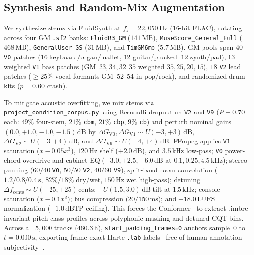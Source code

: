 \documentclass{article}
\begin{document}
\subsection{Synthesis and Random-Mix Augmentation}\label{subsec:random_mix}

We synthesize stems via FluidSynth at $f_s = 22{,}050\,\text{Hz}$ ($16$-bit FLAC), rotating across four GM {\small\texttt{.sf2}} banks: {\small\texttt{FluidR3\_GM}} ($141\,\text{MB}$), {\small\texttt{MuseScore\_\allowbreak General\_\allowbreak Full}} ($468\,\text{MB}$), {\small\texttt{GeneralUser\_\allowbreak GS}} ($31\,\text{MB}$), and {\small\texttt{TimGM6mb}} ($5.7\,\text{MB}$). GM pools span $40$ {\small\texttt{V0}} patches ($16$ keyboard/organ/mallet, $12$ guitar/plucked, $12$ synth/pad), $13$ weighted {\small\texttt{V1}} bass patches (GM~$33, 34, 32, 35$ weighted $35, 25, 20, 15$), $18$ {\small\texttt{V2}} lead patches ($\ge 25\%$ vocal formants GM~$52$--$54$ in pop/rock), and randomized drum kits ($p = 0.60$ crash).

To mitigate acoustic overfitting, we mix stems via {\small\texttt{project\_\allowbreak condition\_\allowbreak corpus.py}} using Bernoulli dropout on {\small\texttt{V2}} and {\small\texttt{V9}} ($P = 0.70$ each: $49\%$ four-stem, $21\%$ {\small\texttt{cbm}}, $21\%$ {\small\texttt{cbp}}, $9\%$ {\small\texttt{cb}}) and perturb nominal gains $(0.0, +1.0, -1.0, -1.5)\,\text{dB}$ by $\Delta G_{\text{V0}}, \Delta G_{\text{V1}} \sim U(-3, +3)\,\text{dB}$, $\Delta G_{\text{V2}} \sim U(-3, +4)\,\text{dB}$, and $\Delta G_{\text{V9}} \sim U(-4, +4)\,\text{dB}$. FFmpeg applies {\small\texttt{V1}} saturation ($x - 0.05x^3$), $120\,\text{Hz}$ shelf ($+2.0\,\text{dB}$), and $3.5\,\text{kHz}$ low-pass; {\small\texttt{V0}} power-chord overdrive and cabinet EQ ($-3.0, +2.5, -6.0\,\text{dB}$ at $0.1, 0.25, 4.5\,\text{kHz}$); stereo panning ($60/40$ {\small\texttt{V0}}, $50/50$ {\small\texttt{V2}}, $40/60$ {\small\texttt{V9}}); split-band room convolution ($1.2/0.8/0.4\,\text{s}$, $82\%/18\%$ dry/wet, $150\,\text{Hz}$ wet high-pass); detuning $\Delta f_{\text{cents}} \sim U(-25, +25)\,\text{cents}$; $\pm U(1.5, 3.0)\,\text{dB}$ tilt at $1.5\,\text{kHz}$; console saturation ($x - 0.1x^3$); bus compression ($20/150\,\text{ms}$); and $-18.0\,\text{LUFS}$ normalization ($-1.0\,\text{dBTP}$ ceiling). This forces the Conformer~\cite{gulati2020conformer,akram2026chordformer} to extract timbre-invariant pitch-class profiles across polyphonic masking and detuned CQT bins. Across all $5{,}000$ tracks ($460.3\,\text{h}$), {\small\texttt{start\_\allowbreak padding\_\allowbreak frames=0}} anchors sample~$0$ to $t = 0.000\,\text{s}$, exporting frame-exact Harte {\small\texttt{.lab}} labels~\cite{harte2005symbolic} free of human annotation subjectivity~\cite{koops2019annotator}.
\end{document}
